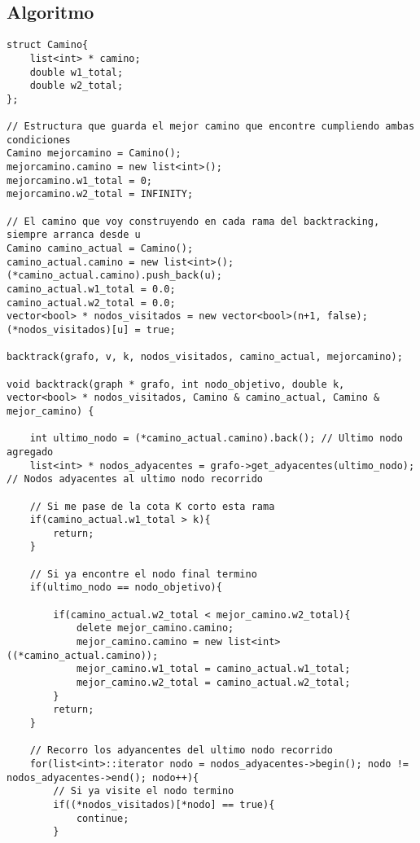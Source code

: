 \newpage
\subsection{Algoritmo}

\begin{lstlisting}
struct Camino{
	list<int> * camino;
	double w1_total;
	double w2_total;
};

// Estructura que guarda el mejor camino que encontre cumpliendo ambas condiciones
Camino mejorcamino = Camino();
mejorcamino.camino = new list<int>();
mejorcamino.w1_total = 0;
mejorcamino.w2_total = INFINITY;

// El camino que voy construyendo en cada rama del backtracking, siempre arranca desde u
Camino camino_actual = Camino();
camino_actual.camino = new list<int>();
(*camino_actual.camino).push_back(u);
camino_actual.w1_total = 0.0;
camino_actual.w2_total = 0.0;
vector<bool> * nodos_visitados = new vector<bool>(n+1, false);
(*nodos_visitados)[u] = true;
		
backtrack(grafo, v, k, nodos_visitados, camino_actual, mejorcamino);

void backtrack(graph * grafo, int nodo_objetivo, double k, vector<bool> * nodos_visitados, Camino & camino_actual, Camino & mejor_camino) {
	
	int ultimo_nodo = (*camino_actual.camino).back(); // Ultimo nodo agregado
	list<int> * nodos_adyacentes = grafo->get_adyacentes(ultimo_nodo); // Nodos adyacentes al ultimo nodo recorrido
	
	// Si me pase de la cota K corto esta rama
	if(camino_actual.w1_total > k){
		return;
	}
	
	// Si ya encontre el nodo final termino
	if(ultimo_nodo == nodo_objetivo){

		if(camino_actual.w2_total < mejor_camino.w2_total){
			delete mejor_camino.camino;
			mejor_camino.camino = new list<int>((*camino_actual.camino));
			mejor_camino.w1_total = camino_actual.w1_total;
			mejor_camino.w2_total = camino_actual.w2_total;
		}
		return;
	}
	
	// Recorro los adyancentes del ultimo nodo recorrido
	for(list<int>::iterator nodo = nodos_adyacentes->begin(); nodo != nodos_adyacentes->end(); nodo++){
		// Si ya visite el nodo termino
		if((*nodos_visitados)[*nodo] == true){
			continue;
		}


\end{lstlisting}
